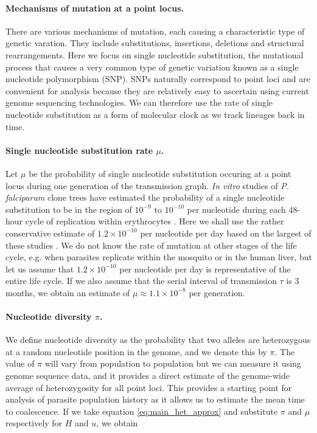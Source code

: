 \documentclass[_main.tex]{subfiles}
\begin{document}
\paragraph{Mechanisms of mutation at a point locus.} There are various mechanisms of mutation, each causing a characteristic type of genetic varation.  They include substitutions, insertions, deletions and structural rearrangements. Here we focus on single nucleotide substitution, the mutational process that causes a very common type of genetic variation known as a single nucleotide polymorphism (SNP).  SNPs naturally correspond to point loci and are convenient for analysis because they are relatively easy to ascertain using current genome sequencing technologies.  We can therefore use the rate of single nucleotide substitution as a form of molecular clock as we track lineages back in time.

\paragraph{Single nucleotide substitution rate $\mu$.}  Let $\mu$ be the probability of single nucleotide substitution occuring at a point locus during one generation of the transmission graph.  \textit{In vitro} studies of \textit{P. falciparum} clone trees have estimated the probability of a single nucleotide substitution to be in the region of $10^{-9}$ to $10^{-10}$ per nucleotide during each 48-hour cycle of replication within erythrocytes \cite{Bopp2013,Claessens2014,Hamilton2016}.  Here we shall use the rather conservative estimate of $1.2 \times 10^{-10}$ per nucleotide per day based on the largest of these studies \cite{Hamilton2016}.  We do not know the rate of mutation at other stages of the life cycle, e.g. when parasites replicate within the mosquito or in the human liver, but let us assume that $1.2 \times 10^{-10}$ per nucleotide per day is representative of the entire life cycle.  If we also assume that the serial interval of transmission $\tau$ is 3 months, we obtain an estimate of $\mu \approx 1.1 \times 10^{-8}$ per generation.  

\paragraph{Nucleotide diversity $\pi$.}  We define nucleotide diversity as the probability that two alleles are heterozygous at a random nucleotide position in the genome, and we denote this by $\pi$.  The value of $\pi$ will vary from population to population but we can measure it using genome sequence data, and it provides a direct estimate of the genome-wide average of heterozygosity for all point loci.   This provides a starting point for analysis of parasite population history as it allows us to estimate the mean time to coalescence.  If we take equation \ref{eq:main_het_approx} and substitute $\pi$ and $\mu$ respectively for $H$ and $u$, we obtain
\end{document}
